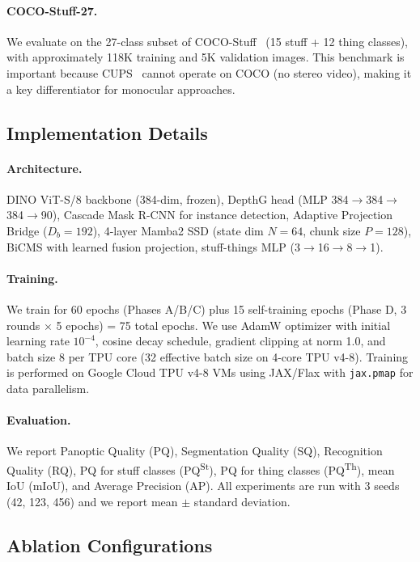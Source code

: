 \documentclass{article}
\begin{document}
\paragraph{COCO-Stuff-27.}
We evaluate on the 27-class subset of COCO-Stuff~\cite{caesar2018cocostuff} (15 stuff + 12 thing classes), with approximately 118K training and 5K validation images. This benchmark is important because CUPS~\cite{hahn2025cups} cannot operate on COCO (no stereo video), making it a key differentiator for monocular approaches.

\subsection{Implementation Details}

\paragraph{Architecture.}
DINO ViT-S/8 backbone (384-dim, frozen), DepthG head (MLP 384$\rightarrow$384$\rightarrow$384$\rightarrow$90), Cascade Mask R-CNN for instance detection, Adaptive Projection Bridge ($D_b = 192$), 4-layer Mamba2 SSD (state dim $N = 64$, chunk size $P = 128$), BiCMS with learned fusion projection, stuff-things MLP (3$\rightarrow$16$\rightarrow$8$\rightarrow$1).

\paragraph{Training.}
We train for 60 epochs (Phases A/B/C) plus 15 self-training epochs (Phase D, 3 rounds $\times$ 5 epochs) = 75 total epochs. We use AdamW optimizer with initial learning rate $10^{-4}$, cosine decay schedule, gradient clipping at norm 1.0, and batch size 8 per TPU core (32 effective batch size on 4-core TPU v4-8). Training is performed on Google Cloud TPU v4-8 VMs using JAX/Flax with \texttt{jax.pmap} for data parallelism.

\paragraph{Evaluation.}
We report Panoptic Quality (PQ), Segmentation Quality (SQ), Recognition Quality (RQ), PQ for stuff classes (PQ\textsuperscript{St}), PQ for thing classes (PQ\textsuperscript{Th}), mean IoU (mIoU), and Average Precision (AP). All experiments are run with 3 seeds (42, 123, 456) and we report mean $\pm$ standard deviation.

\subsection{Ablation Configurations}
\end{document}
